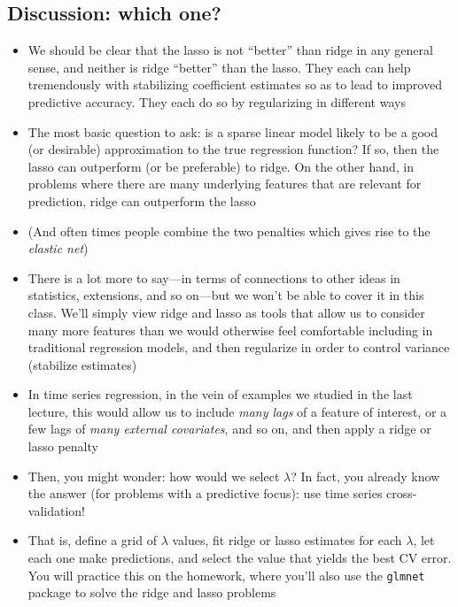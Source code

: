 \documentclass{article}
\begin{document}
\subsection{Discussion: which one?}

\begin{itemize}
\item We should be clear that the lasso is not ``better'' than ridge in any
  general sense, and neither is ridge ``better'' than the lasso. They each can
  help tremendously with stabilizing coefficient estimates so as to lead to
  improved predictive accuracy. They each do so by regularizing in different
  ways 

\item The most basic question to ask: is a sparse linear model likely
  to be a good (or desirable) approximation to the true regression function? If
  so, then the lasso can outperform (or be preferable) to ridge. On the other 
  hand, in problems where there are many underlying features that are relevant
  for prediction, ridge can outperform the lasso 

\item (And often times people combine the two penalties which gives rise to the
  \emph{elastic net}) 

\item There is a lot more to say---in terms of connections to other ideas in
  statistics, extensions, and so on---but we won't be able to cover it in this
  class. We'll simply view ridge and lasso as tools that allow us to consider 
  many more features than we would otherwise feel comfortable including in
  traditional regression models, and then regularize in order to control
  variance (stabilize estimates)   

\item In time series regression, in the vein of examples we studied in the last 
  lecture, this would allow us to include \emph{many lags} of a feature of
  interest, or a few lags of \emph{many external covariates}, and so on, and
  then apply a ridge or lasso penalty

\item Then, you might wonder: how would we select $\lambda$? In fact, you
  already know the answer (for problems with a predictive focus): use time
  series cross-validation! 

\item That is, define a grid of $\lambda$ values, fit ridge or lasso estimates
  for each $\lambda$, let each one make predictions, and select the value that 
  yields the best CV error. You will practice this on the homework, where you'll
  also use the \verb|glmnet| package to solve the ridge and lasso problems 
\end{itemize}
\end{document}
